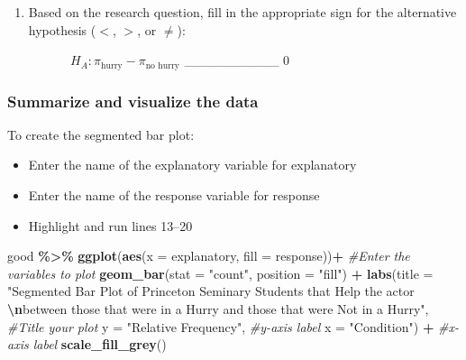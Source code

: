 \documentclass[
]{report}
\newenvironment{Shaded}{\begin{snugshade}}{\end{snugshade}}
\newcommand{\AttributeTok}[1]{\textcolor[rgb]{0.13,0.29,0.53}{#1}}
\newcommand{\CommentTok}[1]{\textcolor[rgb]{0.56,0.35,0.01}{\textit{#1}}}
\newcommand{\FunctionTok}[1]{\textcolor[rgb]{0.13,0.29,0.53}{\textbf{#1}}}
\newcommand{\NormalTok}[1]{#1}
\newcommand{\SpecialCharTok}[1]{\textcolor[rgb]{0.81,0.36,0.00}{\textbf{#1}}}
\newcommand{\StringTok}[1]{\textcolor[rgb]{0.31,0.60,0.02}{#1}}
\providecommand{\tightlist}{%
  \setlength{\itemsep}{0pt}\setlength{\parskip}{0pt}}
\begin{document}
\vspace{0.4in}

\begin{enumerate}
\def\labelenumi{\arabic{enumi}.}
\setcounter{enumi}{1}
\tightlist
\item
  Based on the research question, fill in the appropriate sign for the alternative hypothesis (\(<\), \(>\), or \(\neq\)):
  \vspace{2mm}
\end{enumerate}

~~~~~~~~~~\(H_A: \pi_{\text{hurry}} -\pi_{\text{no hurry}}\) \_\_\_\_\_\_\_\_\_\_ 0

\subsubsection*{Summarize and visualize the data}\label{summarize-and-visualize-the-data}

To create the segmented bar plot:

\begin{itemize}
\item
  Enter the name of the explanatory variable for explanatory
\item
  Enter the name of the response variable for response
\item
  Highlight and run lines 13--20
\end{itemize}

\begin{Shaded}
\begin{Highlighting}[]
\NormalTok{good }\SpecialCharTok{\%\textgreater{}\%}
  \FunctionTok{ggplot}\NormalTok{(}\FunctionTok{aes}\NormalTok{(}\AttributeTok{x =}\NormalTok{ explanatory, }\AttributeTok{fill =}\NormalTok{ response))}\SpecialCharTok{+} \CommentTok{\#Enter the variables to plot}
  \FunctionTok{geom\_bar}\NormalTok{(}\AttributeTok{stat =} \StringTok{"count"}\NormalTok{, }\AttributeTok{position =} \StringTok{"fill"}\NormalTok{) }\SpecialCharTok{+}
  \FunctionTok{labs}\NormalTok{(}\AttributeTok{title =} \StringTok{"Segmented Bar Plot of Princeton Seminary Students that Help the actor }\SpecialCharTok{\textbackslash{}n}\StringTok{between those that were in a Hurry and those that were Not in a Hurry"}\NormalTok{,  }\CommentTok{\#Title your plot}
       \AttributeTok{y =} \StringTok{"Relative Frequency"}\NormalTok{, }\CommentTok{\#y{-}axis label}
       \AttributeTok{x =} \StringTok{"Condition"}\NormalTok{) }\SpecialCharTok{+} \CommentTok{\#x{-}axis label}
  \FunctionTok{scale\_fill\_grey}\NormalTok{()}
\end{Highlighting}
\end{Shaded}
\end{document}
